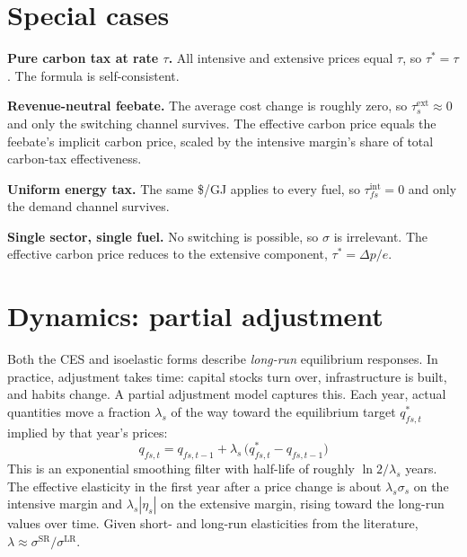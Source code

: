 \documentclass[11pt,a4paper]{article}
\begin{document}
\section{Special cases}\label{sec:special}

\textbf{Pure carbon tax at rate $\tau$.} All intensive and extensive prices equal $\tau$, so $\tau^* = \tau$. The formula is self-consistent.

\textbf{Revenue-neutral feebate.} The average cost change is roughly zero, so $\tau^{\mathrm{ext}}_s \approx 0$ and only the switching channel survives. The effective carbon price equals the feebate's implicit carbon price, scaled by the intensive margin's share of total carbon-tax effectiveness.

\textbf{Uniform energy tax.} The same \$/GJ applies to every fuel, so $\tau^{\mathrm{int}}_{fs} = 0$ and only the demand channel survives.

\textbf{Single sector, single fuel.} No switching is possible, so $\sigma$ is irrelevant. The effective carbon price reduces to the extensive component, $\tau^* = \Delta p/e$.

\section{Dynamics: partial adjustment}\label{sec:dynamics}

Both the CES and isoelastic forms describe \emph{long-run} equilibrium responses. In practice, adjustment takes time: capital stocks turn over, infrastructure is built, and habits change. A partial adjustment model captures this. Each year, actual quantities move a fraction $\lambda_s$ of the way toward the equilibrium target $q^*_{fs,t}$ implied by that year's prices:
\begin{equation}\label{eq:pa}
q_{fs,t} = q_{fs,t-1} + \lambda_s\,\big(q^*_{fs,t} - q_{fs,t-1}\big)
\end{equation}
This is an exponential smoothing filter with half-life of roughly $\ln 2/\lambda_s$ years. The effective elasticity in the first year after a price change is about $\lambda_s\sigma_s$ on the intensive margin and $\lambda_s|\eta_s|$ on the extensive margin, rising toward the long-run values over time. Given short- and long-run elasticities from the literature, $\lambda \approx \sigma^{\mathrm{SR}}/\sigma^{\mathrm{LR}}$.
\end{document}
